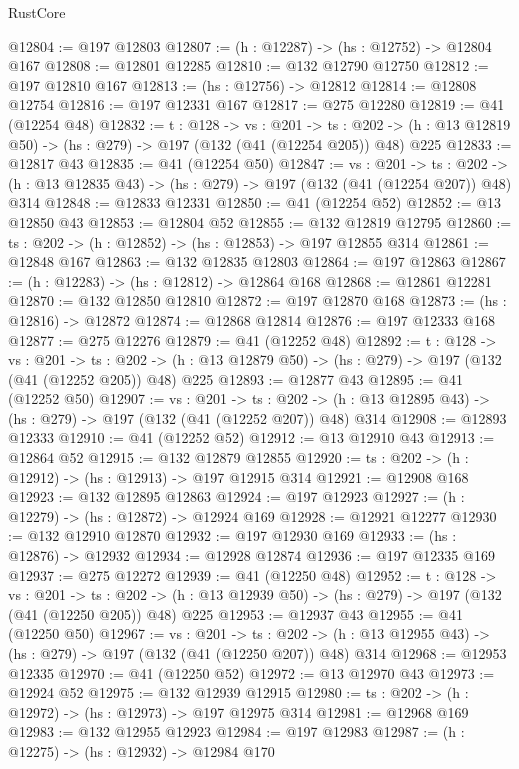 \begin{lexlean}{RustCore}
\begin{coremodule}
@12804 := @197 @12803
@12807 := (h : @12287) -> (hs : @12752) -> @12804 @167
@12808 := @12801 @12285
@12810 := @132 @12790 @12750
@12812 := @197 @12810 @167
@12813 := (hs : @12756) -> @12812
@12814 := @12808 @12754
@12816 := @197 @12331 @167
@12817 := @275 @12280
@12819 := @41 (@12254 @48)
@12832 := {t : @128} ->
  {vs : @201} ->
  {ts : @202} -> (h : @13 @12819 @50) -> (hs : @279) -> @197 (@132 (@41 (@12254 @205)) @48) @225
@12833 := @12817 @43
@12835 := @41 (@12254 @50)
@12847 := {vs : @201} ->
  {ts : @202} -> (h : @13 @12835 @43) -> (hs : @279) -> @197 (@132 (@41 (@12254 @207)) @48) @314
@12848 := @12833 @12331
@12850 := @41 (@12254 @52)
@12852 := @13 @12850 @43
@12853 := @12804 @52
@12855 := @132 @12819 @12795
@12860 := {ts : @202} -> (h : @12852) -> (hs : @12853) -> @197 @12855 @314
@12861 := @12848 @167
@12863 := @132 @12835 @12803
@12864 := @197 @12863
@12867 := (h : @12283) -> (hs : @12812) -> @12864 @168
@12868 := @12861 @12281
@12870 := @132 @12850 @12810
@12872 := @197 @12870 @168
@12873 := (hs : @12816) -> @12872
@12874 := @12868 @12814
@12876 := @197 @12333 @168
@12877 := @275 @12276
@12879 := @41 (@12252 @48)
@12892 := {t : @128} ->
  {vs : @201} ->
  {ts : @202} -> (h : @13 @12879 @50) -> (hs : @279) -> @197 (@132 (@41 (@12252 @205)) @48) @225
@12893 := @12877 @43
@12895 := @41 (@12252 @50)
@12907 := {vs : @201} ->
  {ts : @202} -> (h : @13 @12895 @43) -> (hs : @279) -> @197 (@132 (@41 (@12252 @207)) @48) @314
@12908 := @12893 @12333
@12910 := @41 (@12252 @52)
@12912 := @13 @12910 @43
@12913 := @12864 @52
@12915 := @132 @12879 @12855
@12920 := {ts : @202} -> (h : @12912) -> (hs : @12913) -> @197 @12915 @314
@12921 := @12908 @168
@12923 := @132 @12895 @12863
@12924 := @197 @12923
@12927 := (h : @12279) -> (hs : @12872) -> @12924 @169
@12928 := @12921 @12277
@12930 := @132 @12910 @12870
@12932 := @197 @12930 @169
@12933 := (hs : @12876) -> @12932
@12934 := @12928 @12874
@12936 := @197 @12335 @169
@12937 := @275 @12272
@12939 := @41 (@12250 @48)
@12952 := {t : @128} ->
  {vs : @201} ->
  {ts : @202} -> (h : @13 @12939 @50) -> (hs : @279) -> @197 (@132 (@41 (@12250 @205)) @48) @225
@12953 := @12937 @43
@12955 := @41 (@12250 @50)
@12967 := {vs : @201} ->
  {ts : @202} -> (h : @13 @12955 @43) -> (hs : @279) -> @197 (@132 (@41 (@12250 @207)) @48) @314
@12968 := @12953 @12335
@12970 := @41 (@12250 @52)
@12972 := @13 @12970 @43
@12973 := @12924 @52
@12975 := @132 @12939 @12915
@12980 := {ts : @202} -> (h : @12972) -> (hs : @12973) -> @197 @12975 @314
@12981 := @12968 @169
@12983 := @132 @12955 @12923
@12984 := @197 @12983
@12987 := (h : @12275) -> (hs : @12932) -> @12984 @170

\end{coremodule}
\end{lexlean}
